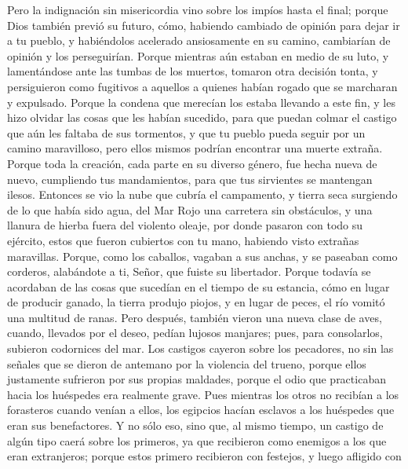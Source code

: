  Pero la indignación sin misericordia vino sobre los
impíos hasta el final; porque Dios también previó su futuro,
 cómo, habiendo cambiado de opinión para dejar ir a tu
pueblo, y habiéndolos acelerado ansiosamente en su camino, cambiarían de
opinión y los perseguirían.  Porque mientras aún estaban
en medio de su luto, y lamentándose ante las tumbas de los muertos,
tomaron otra decisión tonta, y persiguieron como fugitivos a aquellos a
quienes habían rogado que se marcharan y expulsado. 
Porque la condena que merecían los estaba llevando a este fin, y les
hizo olvidar las cosas que les habían sucedido, para que puedan colmar
el castigo que aún les faltaba de sus tormentos,  y que tu
pueblo pueda seguir por un camino maravilloso, pero ellos mismos podrían
encontrar una muerte extraña.  Porque toda la creación,
cada parte en su diverso género, fue hecha nueva de nuevo, cumpliendo
tus mandamientos, para que tus sirvientes se mantengan ilesos.
 Entonces se vio la nube que cubría el campamento, y
tierra seca surgiendo de lo que había sido agua, del Mar Rojo una
carretera sin obstáculos, y una llanura de hierba fuera del violento
oleaje,  por donde pasaron con todo su ejército, estos que
fueron cubiertos con tu mano, habiendo visto extrañas maravillas.
 Porque, como los caballos, vagaban a sus anchas, y se
paseaban como corderos, alabándote a ti, Señor, que fuiste su
libertador.  Porque todavía se acordaban de las cosas que
sucedían en el tiempo de su estancia, cómo en lugar de producir ganado,
la tierra produjo piojos, y en lugar de peces, el río vomitó una
multitud de ranas.  Pero después, también vieron una
nueva clase de aves, cuando, llevados por el deseo, pedían lujosos
manjares;  pues, para consolarlos, subieron codornices
del mar.  Los castigos cayeron sobre los pecadores, no
sin las señales que se dieron de antemano por la violencia del trueno,
porque ellos justamente sufrieron por sus propias maldades, porque el
odio que practicaban hacia los huéspedes era realmente grave.
 Pues mientras los otros no recibían a los forasteros
cuando venían a ellos, los egipcios hacían esclavos a los huéspedes que
eran sus benefactores.  Y no sólo eso, sino que, al mismo
tiempo, un castigo de algún tipo caerá sobre los primeros, ya que
recibieron como enemigos a los que eran extranjeros; 
porque estos primero recibieron con festejos, y luego afligido con
